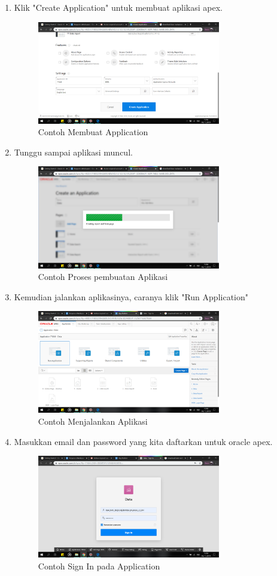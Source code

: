 \begin{enumerate}
\item Klik "Create Application" untuk membuat aplikasi apex.
    \begin{figure}[!htbp]
    \centering
    \includegraphics[width=8cm]{picture/28.png}
    \caption{Contoh Membuat Application}
    \end{figure}
    
\item Tunggu sampai aplikasi muncul.
    \begin{figure}[!htbp]
    \centering
    \includegraphics[width=8cm]{picture/29.png}
    \caption{Contoh Proses pembuatan Aplikasi}
    \end{figure}
    
\newpage
\item Kemudian jalankan aplikasinya, caranya klik "Run Application" 
    \begin{figure}[!htbp]
    \centering
    \includegraphics[width=8cm]{picture/30.png}
    \caption{Contoh Menjalankan Aplikasi}
    \end{figure}

\item Masukkan email dan password yang kita daftarkan untuk oracle apex.
    \begin{figure}[!htbp]
    \centering
    \includegraphics[width=8cm]{picture/31.png}
    \caption{Contoh Sign In pada Application}
    \end{figure}
    

\end{enumerate}
